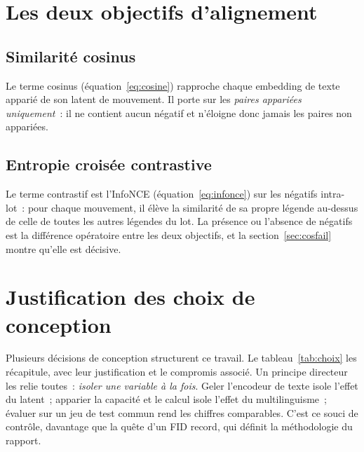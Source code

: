 \documentclass[12pt,a4paper,oneside]{report}
\theoremstyle{definition}
\theoremstyle{plain}
\begin{document}
\section{Les deux objectifs d'alignement}
\label{sec:objectifs}

\subsection{Similarité cosinus}
Le terme cosinus (équation~\eqref{eq:cosine}) rapproche chaque embedding de texte
apparié de son latent de mouvement. Il porte sur les \emph{paires appariées
uniquement}~: il ne contient aucun négatif et n'éloigne donc jamais les paires non
appariées.

\subsection{Entropie croisée contrastive}
Le terme contrastif est l'InfoNCE (équation~\eqref{eq:infonce}) sur les négatifs
intra-lot~: pour chaque mouvement, il élève la similarité de sa propre légende
au-dessus de celle de toutes les autres légendes du lot. La présence ou l'absence
de négatifs est la différence opératoire entre les deux objectifs, et la
section~\ref{sec:cosfail} montre qu'elle est décisive.

\section{Justification des choix de conception}
\label{sec:justif}

Plusieurs décisions de conception structurent ce travail. Le
tableau~\ref{tab:choix} les récapitule, avec leur justification et le compromis
associé. Un principe directeur les relie toutes~: \emph{isoler une variable à la
fois}. Geler l'encodeur de texte isole l'effet du latent~; apparier la capacité et
le calcul isole l'effet du multilinguisme~; évaluer sur un jeu de test commun rend
les chiffres comparables. C'est ce souci de contrôle, davantage que la quête d'un
FID record, qui définit la méthodologie du rapport.
\end{document}
